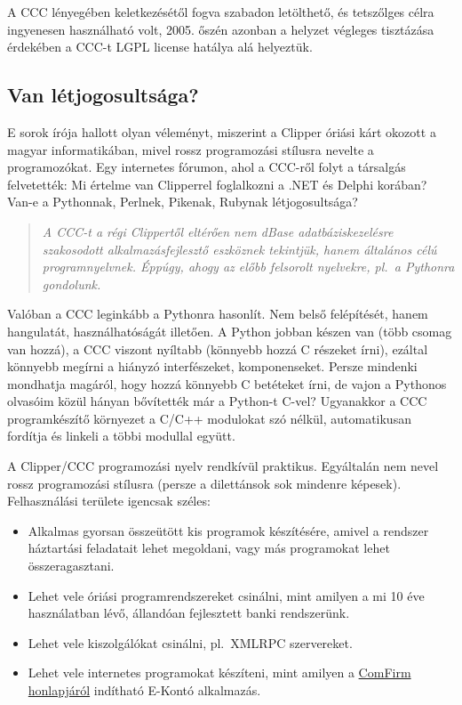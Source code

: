 A CCC lényegében keletkezésétől fogva szabadon letölthető, 
és tetszőlges célra ingyenesen használható volt, 2005. őszén
azonban a helyzet végleges tisztázása érdekében a CCC-t LGPL 
license hatálya alá helyeztük.


\subsection{Van létjogosultsága?} 

E sorok írója hallott olyan véleményt, 
miszerint a Clipper óriási kárt okozott a magyar
informatikában, mivel rossz programozási stílusra
nevelte a programozókat.
Egy internetes fórumon, ahol a CCC-ről folyt a társalgás felvetették:
Mi értelme van  Clipperrel foglalkozni a .NET és Delphi korában?
Van-e a Pythonnak, Perlnek, Pikenak, Rubynak létjogosultsága?

\begin{quote}\em
  A CCC-t a régi Clippertől eltérően nem dBase adatbáziskezelésre
  szakosodott alkalmazásfejlesztő eszköznek tekintjük, 
  hanem általános célú programnyelvnek.  Éppúgy, ahogy az előbb felsorolt   
  nyelvekre,   pl.\ a Pythonra gondolunk.
\end{quote}  

Valóban a CCC leginkább a Pythonra hasonlít. Nem belső
felépítését, hanem hangulatát, használhatóságát illetően.
A Python jobban készen van (több csomag van hozzá),
a CCC viszont nyíltabb (könnyebb hozzá C részeket írni),
ezáltal könnyebb megírni a hiányzó interfészeket, komponenseket.
Persze mindenki mondhatja magáról, hogy hozzá könnyebb C betéteket írni, 
de vajon a Pythonos olvasóim közül hányan bővítették már a Python-t C-vel? 
Ugyanakkor a CCC programkészítő környezet a C/C++ modulokat szó nélkül, 
automatikusan fordítja és linkeli a többi modullal együtt.

A Clipper/CCC programozási nyelv rendkívül praktikus. 
Egyáltalán nem nevel rossz programozási stílusra (persze
a dilettánsok sok mindenre képesek). 
Felhasználási területe igencsak széles:

\begin{itemize}
\item 
  Alkalmas gyorsan összeütött kis programok készítésére, 
  amivel a rendszer háztartási feladatait lehet megoldani,
  vagy más programokat lehet összeragasztani. 
\item  
  Lehet vele óriási programrendszereket csinálni,
  mint amilyen a mi 10 éve használatban lévő,
  állandóan fejlesztett banki rendszerünk. 
\item
  Lehet vele kiszolgálókat csinálni, pl.\ XMLRPC szervereket.
\item
  Lehet vele internetes programokat készíteni, mint amilyen a     
  \href{http://www.comfirm.hu}{ComFirm honlapjáról} 
  indítható E-Kontó alkalmazás.
\end{itemize}

